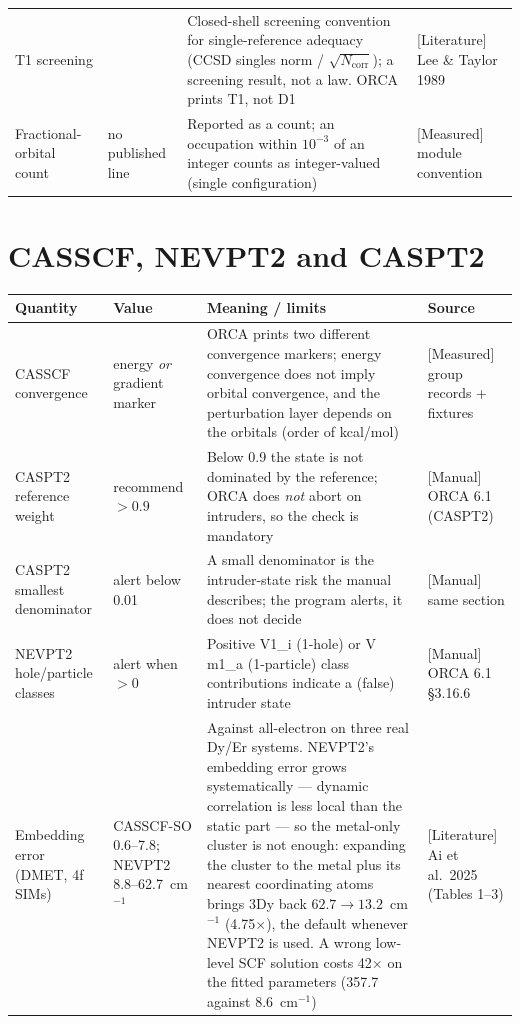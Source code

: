 \begin{center}
\begin{tabularx}{\textwidth}{@{}>{\raggedright\arraybackslash}p{3.2cm} >{\raggedright\arraybackslash}p{2.0cm} X >{\raggedright\arraybackslash}p{3.2cm}@{}}
T1 screening & 0.02 & Closed-shell screening convention for single-reference
  adequacy (CCSD singles norm / $\sqrt{N_{\text{corr}}}$); a screening result,
  not a law. ORCA prints T1, not D1 & \textsf{[Literature]} Lee \& Taylor 1989 \\
Fractional-orbital count & no published line & Reported as a count; an
  occupation within $10^{-3}$ of an integer counts as integer-valued (single
  configuration) & \textsf{[Measured]} module convention \\
\bottomrule
\end{tabularx}
\end{center}

\section{CASSCF, NEVPT2 and CASPT2}

\begin{center}
\begin{tabularx}{\textwidth}{@{}>{\raggedright\arraybackslash}p{3.2cm} >{\raggedright\arraybackslash}p{2.0cm} X >{\raggedright\arraybackslash}p{3.2cm}@{}}
\toprule
Quantity & Value & Meaning / limits & Source \\
\midrule
CASSCF convergence & energy \emph{or} gradient marker & ORCA prints two
  different convergence markers; energy convergence does not imply orbital
  convergence, and the perturbation layer depends on the orbitals (order of
  kcal/mol) & \textsf{[Measured]} group records + fixtures \\
CASPT2 reference weight & recommend $> 0.9$ & Below 0.9 the state is not
  dominated by the reference; ORCA does \emph{not} abort on intruders, so the
  check is mandatory & \textsf{[Manual]} ORCA 6.1 (CASPT2) \\
CASPT2 smallest denominator & alert below 0.01 & A small denominator is the
  intruder-state risk the manual describes; the program alerts, it does not
  decide & \textsf{[Manual]} same section \\
NEVPT2 hole/particle classes & alert when $> 0$ & Positive V1\_i (1-hole) or
  V m1\_a (1-particle) class contributions indicate a (false) intruder state &
  \textsf{[Manual]} ORCA 6.1 \S3.16.6 \\
Embedding error (DMET, 4f SIMs) & CASSCF-SO 0.6--7.8; NEVPT2 8.8--62.7~cm$^{-1}$
  & Against all-electron on three real Dy/Er systems. NEVPT2's embedding error
  grows systematically --- dynamic correlation is less local than the static
  part --- so the metal-only cluster is not enough: expanding the cluster to the
  metal plus its nearest coordinating atoms brings 3Dy back $62.7 \to
  13.2$~cm$^{-1}$ (4.75$\times$), the default whenever NEVPT2 is used. A wrong
  low-level SCF solution costs 42$\times$ on the fitted parameters (357.7
  against 8.6~cm$^{-1}$) & \textsf{[Literature]} Ai et al.\ 2025 (Tables 1--3) \\
\bottomrule
\end{tabularx}
\end{center}

